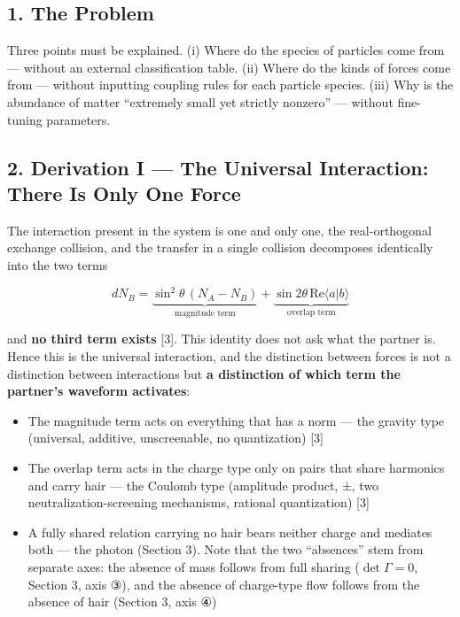\documentclass[
  a4paper,
]{article}
\providecommand{\tightlist}{%
  \setlength{\itemsep}{0pt}\setlength{\parskip}{0pt}}
\begin{document}
\subsection{1. The Problem}\label{the-problem}

Three points must be explained. (i) Where do the species of particles
come from --- without an external classification table. (ii) Where do
the kinds of forces come from --- without inputting coupling rules for
each particle species. (iii) Why is the abundance of matter ``extremely
small yet strictly nonzero'' --- without fine-tuning parameters.

\subsection{2. Derivation I --- The Universal Interaction: There Is Only
One
Force}\label{derivation-i-the-universal-interaction-there-is-only-one-force}

The interaction present in the system is one and only one, the
real-orthogonal exchange collision, and the transfer in a single
collision decomposes identically into the two terms

\[
dN_B=\underbrace{\sin^2\theta\,(N_A-N_B)}_{\text{magnitude term}}+\underbrace{\sin 2\theta\,\mathrm{Re}\langle a|b\rangle}_{\text{overlap term}}
\]

and \textbf{no third term exists} {[}3{]}. This identity does not ask
what the partner is. Hence this is the universal interaction, and the
distinction between forces is not a distinction between interactions but
\textbf{a distinction of which term the partner's waveform activates}:

\begin{itemize}
\tightlist
\item
  The magnitude term acts on everything that has a norm --- the gravity
  type (universal, additive, unscreenable, no quantization) {[}3{]}
\item
  The overlap term acts in the charge type only on pairs that share
  harmonics and carry hair --- the Coulomb type (amplitude product, ±,
  two neutralization-screening mechanisms, rational quantization)
  {[}3{]}
\item
  A fully shared relation carrying no hair bears neither charge and
  mediates both --- the photon (Section 3). Note that the two
  ``absences'' stem from separate axes: the absence of mass follows from
  full sharing (\(\det\Gamma=0\), Section 3, axis ③), and the absence of
  charge-type flow follows from the absence of hair (Section 3, axis ④)
\end{itemize}
\end{document}
